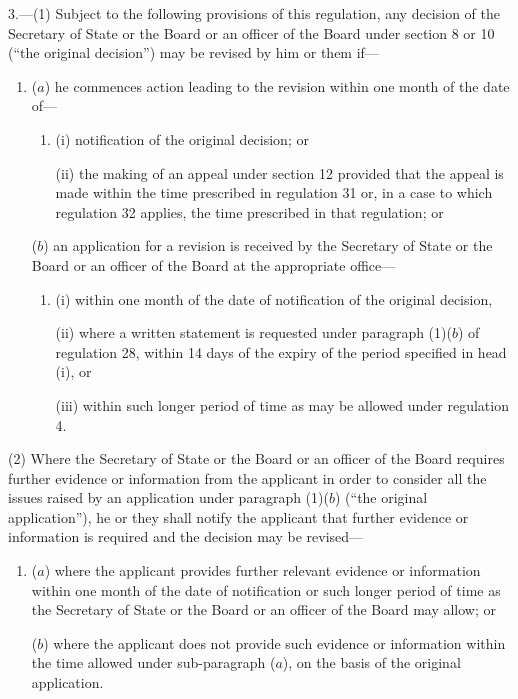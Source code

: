 \documentclass[12pt,a4paper]{article}
\begin{document}
3.—(1) Subject to the following provisions of this regulation, any decision of the Secretary of State 
or the Board or an officer of the Board  %
under section 8 or 10 (“the original decision”) may be revised by him 
or them  %
if—
\begin{enumerate}\item[]

($a$) he commences action leading to the revision within one month of the date of—
\begin{enumerate}\item[]
(i) notification of the original decision; or

(ii) the making of an appeal under section 12 provided that the appeal is made within the time prescribed in regulation 31 or, in a case to which regulation 32 applies, the time prescribed in that regulation; or
\end{enumerate}

($b$) an application for a revision is received by the Secretary of State 
or the Board or an officer of the Board  %
at the appropriate office—
\begin{enumerate}\item[]
(i) within one month of the date of notification of the original decision,

(ii) where a written statement is requested under paragraph (1)($b$) of regulation 28, within 14 days of the expiry of the period specified in head (i), or

(iii) within such longer period of time as may be allowed under regulation 4.
\end{enumerate}
\end{enumerate}

(2) Where the Secretary of State 
or the Board or an officer of the Board  %
requires further evidence or information from the applicant in order to consider all the issues raised by an application under paragraph (1)($b$) (“the original application”), he 
or they  %
shall notify the applicant that further evidence or information is required and the decision may be revised—
\begin{enumerate}\item[]
($a$) where the applicant provides further relevant evidence or information within one month of the date of notification or such longer period of time as the Secretary of State 
or the Board or an officer of the Board  %
may allow; or

($b$) where the applicant does not provide such evidence or information within the time allowed under sub-paragraph ($a$), on the basis of the original application.
\end{enumerate}
\end{document}

